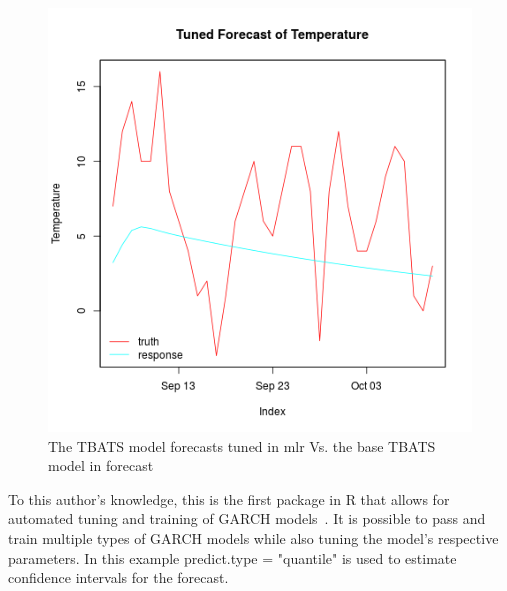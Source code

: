 \documentclass[12pt]{article}\usepackage[]{graphicx}\usepackage[]{color}
\makeatletter
\theoremstyle{definition}
\newcommand\code{\@codex}
\def\@codex#1{{\normalfont\ttfamily\hyphenchar\font=-1 #1}}
\let\proglang=\textsf
\newcommand{\pkg}[1]{{\fontseries{b}\selectfont #1}}
\makeatother
\begin{document}
\begin{figure}[H]
  \includegraphics[width=\linewidth]{plot_tbats_vs_forecast.png}
  \centering
  \caption{The TBATS model forecasts tuned in \pkg{mlr} Vs. the base TBATS model in forecast}
  \label{fig:mlrvsforecast}
\end{figure}

To this author's knowledge, this is the first package in \proglang{R} that allows for automated tuning and training of GARCH models~\cite{garchengels}. It is possible to pass and train multiple types of GARCH models while also tuning the model's respective parameters. In this example \code{predict.type = "quantile"} is used to estimate confidence intervals for the forecast.
\end{document}
